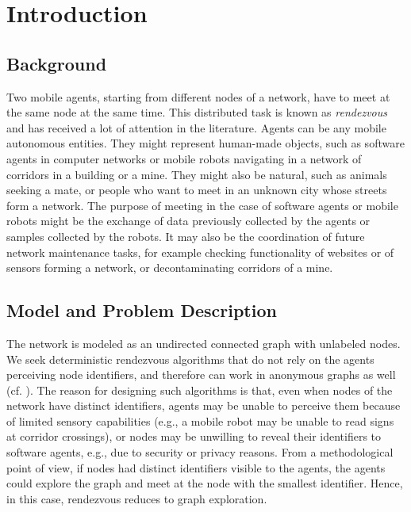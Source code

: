 \documentclass{llncs}
\begin{document}
\vspace{2ex}


\vfill

\thispagestyle{empty}
\pagebreak


\section{Introduction}


\subsection{Background}

Two mobile agents, starting from different nodes of a network, have to meet at the same node at the same time.
This distributed task is known as {\em rendezvous} and has received a lot of attention in the literature.
Agents can be any mobile autonomous entities. They might represent human-made objects, such as software agents in computer networks or mobile robots navigating in a network of corridors in a building or a mine. They might also be natural, such as animals seeking a mate,
or people who want to meet in an unknown city whose streets form a network. 
The purpose of meeting in the case of software agents or mobile robots might be the exchange of data previously collected by the agents
or samples collected by the robots. It may also be the coordination
of future network maintenance tasks, for example checking functionality of websites or of sensors forming a network, or decontaminating corridors of a mine.

\subsection{Model and Problem Description}

The network is modeled as an undirected connected graph with  unlabeled nodes.
We seek deterministic rendezvous algorithms that do not
rely on the agents perceiving node identifiers, and therefore can work in anonymous graphs as well  (cf. \cite{alpern02b}). 
The reason for designing such algorithms
is that, even when nodes of the network have distinct identifiers, agents may be unable to perceive them
because of limited sensory capabilities (e.g., a mobile robot may be unable to read signs at corridor crossings), 
or nodes may be unwilling to reveal their identifiers to software agents, e.g., due to security or privacy reasons.
From a methodological point of view, if nodes had distinct identifiers visible to the agents, the agents could explore the graph and meet at the node
with the smallest identifier. Hence, in this case, rendezvous
reduces to graph exploration.
\end{document}
